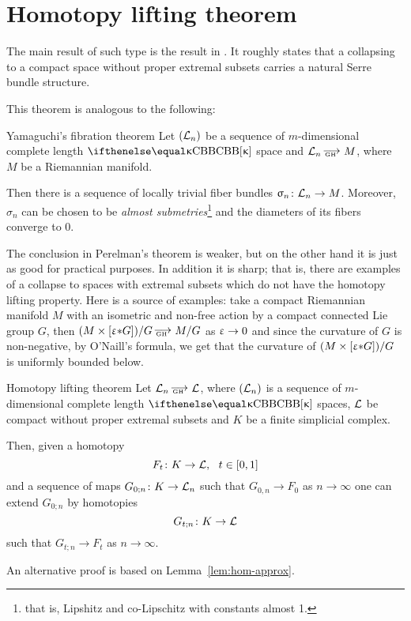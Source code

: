 \section{Homotopy lifting theorem}

The main result of such type is the result in
\cite{perelman:collapsing}. 
It roughly states that a collapsing to a compact
space without proper extremal subsets carries a natural Serre bundle structure.

This theorem is analogous to  the following:

\begin{thm}{Yamaguchi's fibration theorem
\cite{yamaguchi:bundle}}
Let $(\mathcal{L}_n)$ be a sequence of $m$-dimensional complete length $\Alex\kappa$ space and $\spc{L}_n\GHto M$, where $M$ be a Riemannian manifold.

Then there is a sequence of locally trivial fiber bundles $\sigma_n\:\spc{L}_n\to M$.
Moreover, $\sigma_n$ can be chosen to be \emph{almost submetries}\footnote{that is, Lipshitz and co-Lipschitz with constants almost 1.} and the diameters of
its fibers converge to $0$.
\end{thm}

The conclusion in Perelman's theorem is weaker, but on the other hand it is just
as good for practical purposes. 
In addition it is sharp; that is, there are examples of a collapse to spaces with
extremal subsets which do not have the homotopy lifting property. 
Here is a source of examples: take a compact Riemannian manifold $M$ with an isometric and
non-free action by a compact connected Lie group $G$, then 
$(M\times [\eps\blow G])/G\GHto M/G$ as $\eps\to0$ and since the curvature of $G$ is non-negative, by
O'Naill's formula, we get that the curvature of $(M\times [\eps\blow G])/G$ is uniformly bounded
below.

\begin{thm}{Homotopy lifting theorem}
\label{thm:per-ser} Let $\spc{L}_n\GHto \spc{L}$, where $(\mathcal{L}_n)$ is a sequence of $m$-dimensional complete length $\Alex\kappa$ spaces, $\mathcal{L}$ be compact
without proper extremal subsets and $K$ be a finite simplicial complex. 

Then, given a homotopy 
\[F_t\:K\to \spc{L},\ \ t\in [0,1]\] 
and a sequence of maps 
$G_{0;n}\:K\to \spc{L}_n$ such that $G_{0,n}\to F_0$ as $n\to\infty$ one can extend
$G_{0;n}$ by homotopies 
\[G_{t;n}\:K\to \spc{L}\]
such that $G_{t;n}\to F_t$ as $n\to\infty$.
\end{thm}

An alternative proof is based on Lemma~\ref{lem:hom-approx}.


